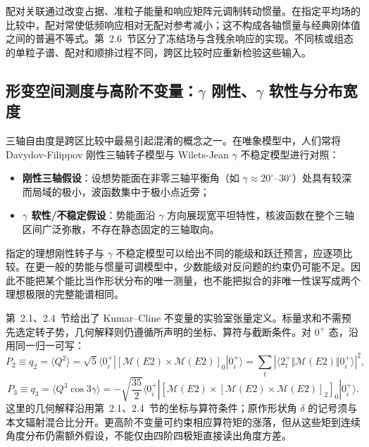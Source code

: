 配对关联通过改变占据、准粒子能量和响应矩阵元调制转动惯量。在指定平均场的比较中，配对常使低频响应相对无配对参考减小；这不构成各轴惯量与经典刚体值之间的普遍不等式。第~2.6~节区分了冻结场与含残余响应的实现。不同核或组态的单粒子谱、配对和顺排过程不同，跨区比较时应重新检验这些输入。

\subsection{形变空间测度与高阶不变量：$\gamma$ 刚性、$\gamma$ 软性与分布宽度}\label{sec:4-1-3}

三轴自由度是跨区比较中最易引起混淆的概念之一。在唯象模型中，人们常将 Davydov-Filippov 刚性三轴转子模型与 Wilets-Jean $\gamma$ 不稳定模型进行对照：
\begin{itemize}
\item \textbf{刚性三轴假设}：设想势能面在非零三轴平衡角（如 $\gamma \approx 20^\circ\text{--}30^\circ$）处具有较深而局域的极小，波函数集中于极小点近旁；
\item \textbf{$\gamma$ 软性/不稳定假设}：势能面沿 $\gamma$ 方向展现宽平坦特性，核波函数在整个三轴区间广泛弥散，不存在静态固定的三轴取向。
\end{itemize}

指定的理想刚性转子与 $\gamma$ 不稳定模型可以给出不同的能级和跃迁预言，应逐项比较。在更一般的势能与惯量可调模型中，少数能级对反问题的约束仍可能不足。因此不能把某个能比当作形状分布的唯一测量，也不能把拟合的非唯一性误写成两个理想极限的完整能谱相同。

第~2.1、2.4~节给出了 Kumar--Cline 不变量的实验室张量定义\cite{cline-1986-nuclear-shapes-coulomb-excitation}。标量求和不需预先选定转子势，几何解释则仍遵循所声明的坐标、算符与截断条件。对 $0^+$ 态，沿用同一归一可写：
\begin{equation}\label{eq:4-1-q2-invariant}
P_2\equiv q_2=\langle Q^2\rangle=\sqrt5\langle0_i^+|[\mathcal M(E2)\times\mathcal M(E2)]_0|0_i^+\rangle=\sum_t|\langle2_t^+\Vert\mathcal M(E2)\Vert0_i^+\rangle|^2,
\end{equation}
\begin{equation}\label{eq:4-1-q3-invariant}
P_3\equiv q_3=\langle Q^3\cos3\gamma\rangle=-\sqrt{\frac{35}{2}}\langle0_i^+|[\mathcal M(E2)\times[\mathcal M(E2)\times\mathcal M(E2)]_2]_0|0_i^+\rangle.
\end{equation}
这里的几何解释沿用第~2.1、2.4~节的坐标与算符条件；原作形状角 $\delta$ 的记号须与本文辐射混合比分开。更高阶不变量可约束相应算符矩的涨落，但从这些矩到连续角度分布仍需额外假设，不能仅由四阶四极矩直接读出角度方差。

